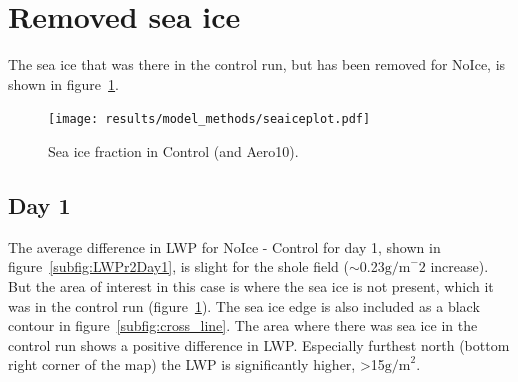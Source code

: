 \section{Removed sea ice}
The sea ice that was there in the control run, but has been removed for NoIce, is shown in figure~\ref{fig:seaice}.

\begin{figure}
\centering
\texttt{[image: results/model\_methods/seaiceplot.pdf]}
\caption{Sea ice fraction in Control (and Aero10).}
\label{fig:seaice}
\end{figure}

\subsection{Day 1}
\label{sec:noiceDay1}
The average difference in LWP for NoIce - Control for day 1, shown in figure~\ref{subfig:LWPr2Day1}, is slight for the shole field ($\sim$0.23$\text{g/m}^-2$ increase). But the area of interest in this case is where the sea ice is not present, which it was in the control run (figure~\ref{fig:seaice}). The sea ice edge is also included as a black contour in figure~\ref{subfig:cross_line}. The area where there was sea ice in the control run shows a positive difference in LWP. Especially furthest north (bottom right corner of the map) the LWP is significantly higher, >15$\text{g/m}^2$.


